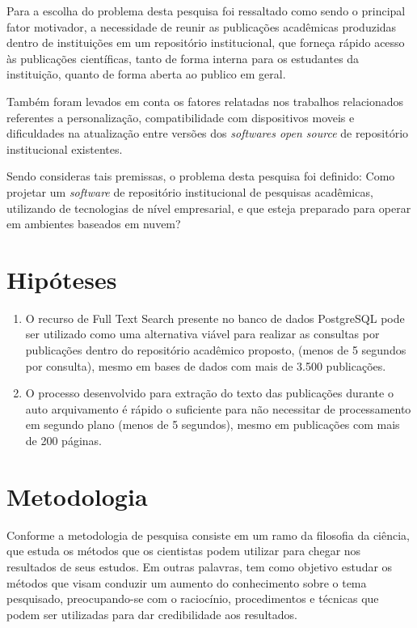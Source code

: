 Para a escolha do problema desta pesquisa foi ressaltado como sendo
o principal fator motivador, a necessidade de reunir as publicações acadêmicas
produzidas dentro de instituições em um repositório institucional,
que forneça rápido acesso às publicações científicas,
tanto de forma interna para os estudantes da instituição,
quanto de forma aberta ao publico em geral.

Também foram levados em conta os fatores relatadas nos trabalhos
relacionados referentes a personalização, compatibilidade com
dispositivos moveis e dificuldades na atualização entre versões
dos \emph{softwares open source} de repositório institucional existentes.

Sendo consideras tais premissas, o problema desta pesquisa foi definido:
Como projetar um \emph{software} de repositório institucional de pesquisas
acadêmicas, utilizando de tecnologias de nível empresarial, e que esteja
preparado para operar em ambientes baseados em nuvem?

\section{Hipóteses} \label{sec::Hypothesis}
\begin{enumerate}
    \item O recurso de Full Text Search presente no banco de dados PostgreSQL
          pode ser utilizado como uma alternativa viável para realizar
          as consultas por publicações dentro do repositório acadêmico
          proposto, (menos de 5 segundos por consulta), mesmo em bases de
          dados com mais de 3.500 publicações.

    \item O processo desenvolvido para extração do texto das publicações
          durante o auto arquivamento é rápido o suficiente para não
          necessitar de processamento em segundo plano (menos de 5 segundos),
          mesmo em publicações com mais de 200 páginas.

\end{enumerate}

\section{Metodologia} \label{sec:Methodology}

Conforme \citep[p. 15]{LOVATO:metodologia} a metodologia de pesquisa
consiste em um ramo da filosofia da ciência, que estuda os métodos que
os cientistas podem utilizar para chegar nos resultados de seus estudos.
Em outras palavras, tem como objetivo estudar os métodos que visam
conduzir um aumento do conhecimento sobre o tema pesquisado, preocupando-se
com o raciocínio, procedimentos e técnicas que podem ser utilizadas para
dar credibilidade aos resultados.

